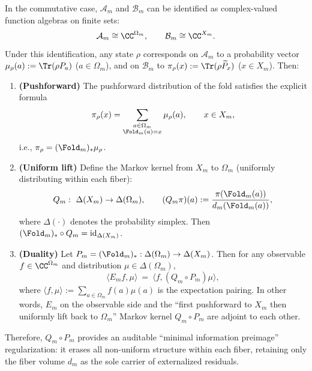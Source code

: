 \begin{theorem}\label{prop:fold-pushforward-lift}
In the commutative case, $\mathcal{A}_m$ and $\mathcal{B}_m$ can be identified as complex-valued function algebras on finite sets:
\[
\mathcal{A}_m\cong \CC^{\Omega_m},\qquad
\mathcal{B}_m\cong \CC^{X_m}.
\]
Under this identification, any state $\rho$ corresponds on $\mathcal{A}_m$ to a probability vector
\(
\mu_\rho(a):=\Tr(\rho P_a)
\)
($a\in\Omega_m$), and on $\mathcal{B}_m$ to
\(
\pi_\rho(x):=\Tr(\rho \widetilde P_x)
\)
($x\in X_m$). Then:
\begin{enumerate}
  \item \textbf{(Pushforward)} The pushforward distribution of the fold satisfies the explicit formula
  \[
  \pi_\rho(x)=\sum_{\substack{a\in\Omega_m\\ \Fold_m(a)=x}}\mu_\rho(a),
  \qquad x\in X_m,
  \]
  i.e., $\pi_\rho=(\Fold_m)_*\mu_\rho$.
  \item \textbf{(Uniform lift)} Define the Markov kernel from $X_m$ to $\Omega_m$ (uniformly distributing within each fiber):
  \[
  Q_m:\ \Delta(X_m)\to\Delta(\Omega_m),\qquad
  (Q_m\pi)(a):=\frac{\pi(\Fold_m(a))}{d_m(\Fold_m(a))},
  \]
  where $\Delta(\cdot)$ denotes the probability simplex. Then $(\Fold_m)_*\circ Q_m=\mathrm{id}_{\Delta(X_m)}$.
  \item \textbf{(Duality)} Let $P_m=(\Fold_m)_*:\Delta(\Omega_m)\to\Delta(X_m)$. Then for any observable $f\in \CC^{\Omega_m}$ and distribution $\mu\in\Delta(\Omega_m)$,
  \[
  \langle E_m f,\mu\rangle\ =\ \langle f,(Q_m\circ P_m)\mu\rangle,
  \]
  where $\langle f,\mu\rangle:=\sum_{a\in\Omega_m} f(a)\mu(a)$ is the expectation pairing. In other words, $E_m$ on the observable side and the ``first pushforward to $X_m$ then uniformly lift back to $\Omega_m$'' Markov kernel $Q_m\circ P_m$ are adjoint to each other.
\end{enumerate}
Therefore, $Q_m\circ P_m$ provides an auditable ``minimal information preimage'' regularization: it erases all non-uniform structure within each fiber, retaining only the fiber volume $d_m$ as the sole carrier of externalized residuals.
\end{theorem}

